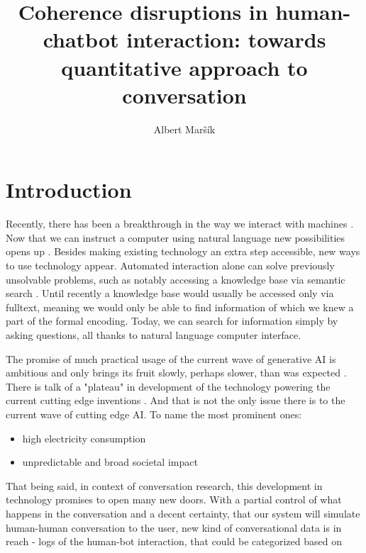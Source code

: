 \documentclass[12pt]{report}
\title{Coherence disruptions in human-chatbot interaction: towards quantitative approach to conversation}
\date{}
\author{Albert Maršík}
\begin{document}

\maketitle

\chapter*{Introduction}

\par
Recently, there has been a breakthrough in the way we interact with machines \cite{sharma2024exploring}.
Now that we can instruct a computer using natural language new possibilities opens up \cite{hendrix1982natural}.
Besides making existing technology an extra step accessible,
new ways to use technology appear.
Automated interaction alone can solve previously unsolvable problems,
such as notably accessing a knowledge base via semantic search \cite{makela2005survey}.
Until recently a knowledge base would usually be accessed only via fulltext,
meaning we would only be able to find
information of which we knew a part of the formal encoding.
Today, we can search for information simply by asking questions,
all thanks to natural language computer interface.
\par
The promise of much practical usage of the current wave of generative AI is ambitious
and only brings its fruit slowly, perhaps slower, than was expected
\cite{bloomberg2024openai1}\cite{reuters2024openai}.
There is talk of a "plateau" in development of the technology powering the current cutting edge inventions \cite{ritter2024ai}.
And that is not the only issue there is to the current wave of cutting edge AI. To name the most prominent ones:

\begin{itemize}

    \item
    high electricity consumption \cite{ritchie2024ai}

    \item
    unpredictable and broad societal impact \cite{hagerty2019global}\cite{baldassarre2023social}
\end{itemize}

That being said, in context of conversation research,
this development in technology promises to open many new doors.
With a partial control of what happens in the conversation and a decent certainty, that
our system will simulate human-human conversation to the user,
new kind of conversational data is in reach -
logs of the human-bot interaction, that could be categorized based on
\end{document}
